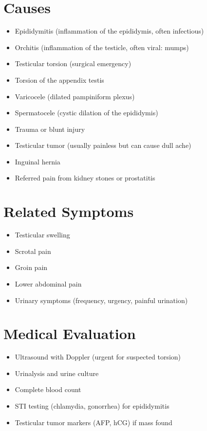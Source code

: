 \section*{Causes}
\begin{itemize}
\item Epididymitis (inflammation of the epididymis, often infectious)
\item Orchitis (inflammation of the testicle, often viral: mumps)
\item Testicular torsion (surgical emergency)
\item Torsion of the appendix testis
\item Varicocele (dilated pampiniform plexus)
\item Spermatocele (cystic dilation of the epididymis)
\item Trauma or blunt injury
\item Testicular tumor (usually painless but can cause dull ache)
\item Inguinal hernia
\item Referred pain from kidney stones or prostatitis
\end{itemize}

\section*{Related Symptoms}
\begin{itemize}
\item Testicular swelling
\item Scrotal pain
\item Groin pain
\item Lower abdominal pain
\item Urinary symptoms (frequency, urgency, painful urination)
\end{itemize}

\section*{Medical Evaluation}
\begin{itemize}
\item Ultrasound with Doppler (urgent for suspected torsion)
\item Urinalysis and urine culture
\item Complete blood count
\item STI testing (chlamydia, gonorrhea) for epididymitis
\item Testicular tumor markers (AFP, hCG) if mass found
\end{itemize}

